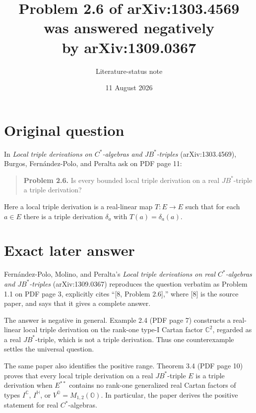 \documentclass[11pt]{article}
\title{Problem 2.6 of arXiv:1303.4569 was answered negatively\\by arXiv:1309.0367}
\author{Literature-status note}
\date{11 August 2026}
\begin{document}
\maketitle

\begin{center}
\end{center}

\section*{Original question}

In \emph{Local triple derivations on $C^*$-algebras and $JB^*$-triples}
(arXiv:1303.4569), Burgos, Fern\'andez-Polo, and Peralta ask on PDF page 11:
\begin{quote}
\textbf{Problem 2.6.} Is every bounded local triple derivation on a real
$JB^*$-triple a triple derivation?
\end{quote}
Here a local triple derivation is a real-linear map $T:E\to E$ such that for
each $a\in E$ there is a triple derivation $\delta_a$ with
$T(a)=\delta_a(a)$.

\section*{Exact later answer}

Fern\'andez-Polo, Molino, and Peralta's
\emph{Local triple derivations on real $C^*$-algebras and $JB^*$-triples}
(arXiv:1309.0367) reproduces the question verbatim as Problem 1.1 on PDF
page 3, explicitly cites ``[8, Problem 2.6],'' where [8] is the source paper,
and says that it gives a complete answer.

The answer is negative in general.  Example 2.4 (PDF page 7) constructs a
real-linear local triple derivation on the rank-one type-I Cartan factor
$\mathbb C^2$, regarded as a real $JB^*$-triple, which is not a triple
derivation.  Thus one counterexample settles the universal question.

The same paper also identifies the positive range.  Theorem 3.4 (PDF page 10)
proves that every local triple derivation on a real $JB^*$-triple $E$ is a
triple derivation when $E^{**}$ contains no rank-one generalized real Cartan
factors of types $I^{\mathbb C}$, $I^{\mathbb H}$, or
$V^{\mathbb O}=M_{1,2}(\mathbb O)$.  In particular, the paper derives the
positive statement for real $C^*$-algebras.
\end{document}
